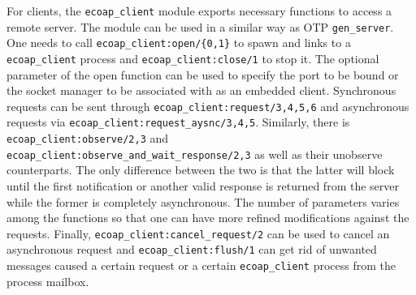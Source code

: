 For clients, the \verb|ecoap_client| module exports necessary functions to access a remote server. The module can be used in a similar way as OTP \verb|gen_server|. One needs to call \verb|ecoap_client:open/{0,1}| to spawn and links to a \verb|ecoap_client| process and \verb|ecoap_client:close/1| to stop it. The optional parameter of the open function can be used to specify the port to be bound or the socket manager to be associated with as an embedded client. Synchronous requests can be sent through \verb|ecoap_client:request/3,4,5,6| and asynchronous requests via \verb|ecoap_client:request_aysnc/3,4,5|. Similarly, there is \verb|ecoap_client:observe/2,3| and \verb|ecoap_client:observe_and_wait_response/2,3|  as well as their unobserve counterparts. The only difference between the two is that the latter will block until the first notification or another valid response is returned from the server while the former is completely asynchronous. The number of parameters varies among the functions so that one can have more refined modifications against the requests. Finally, \verb|ecoap_client:cancel_request/2| can be used to cancel an asynchronous request and \verb|ecoap_client:flush/1| can get rid of unwanted messages caused a certain request or a certain \verb|ecoap_client| process from the process mailbox. 


